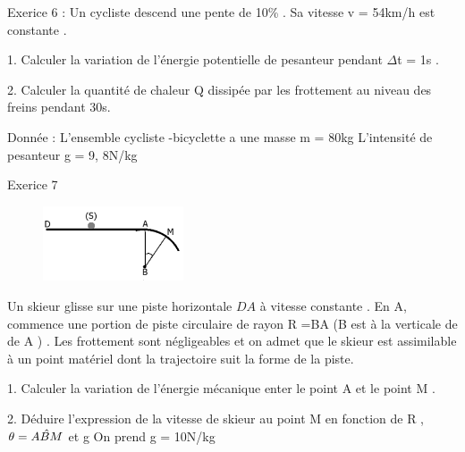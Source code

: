 \documentclass[12pt, french]{article}
\begin{document}
\begin{Box2}{Exerice 6 : }
Un cycliste descend une pente de 10\% . Sa vitesse v = 54km/h est constante .

1. Calculer la variation de l’énergie potentielle de pesanteur pendant $\Delta$t = 1s .

2. Calculer la quantité de chaleur Q dissipée par les frottement au niveau des freins pendant 30s.

Donnée : L’ensemble cycliste -bicyclette a une masse m = 80kg L’intensité de pesanteur g = 9, 8N/kg

\end{Box2}

\begin{Box2}{Exerice 7 }
\begin{figure}
  \begin{center}
    \includegraphics[width=0.37\textwidth]{./img/img05.png}
  \end{center}
\end{figure}

   Un skieur glisse sur une piste horizontale $DA$ à vitesse constante . En A, commence une portion de piste circulaire de rayon R =BA (B est à la verticale de de A ) . Les frottement sont négligeables et on admet que le skieur est assimilable à un point matériel dont la trajectoire suit la forme de la piste.

1. Calculer la variation de l’énergie mécanique enter le point A et le point M .

   2. Déduire l’expression de la vitesse de skieur au point M en fonction de R , $\theta=\Hat{ABM}$ et g
On prend g = 10N/kg

\end{Box2}
\end{document}
